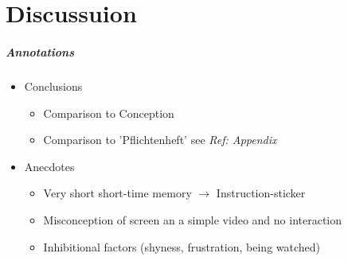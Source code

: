 \chapter{Discussuion}
\label{discussion}

\paragraph{Annotations}

\begin{itemize}
	\item Conclusions
	\begin{itemize}
		\item Comparison to Conception
		\item Comparison to 'Pflichtenheft' see \textit{Ref: Appendix}
	\end{itemize}
	\item Anecdotes
	\begin{itemize}
		\item Very short short-time memory $\to$ Instruction-sticker
		\item Misconception of screen an a simple video and no interaction
		\item Inhibitional factors (shyness, frustration, being watched)
	\end{itemize}
\end{itemize}